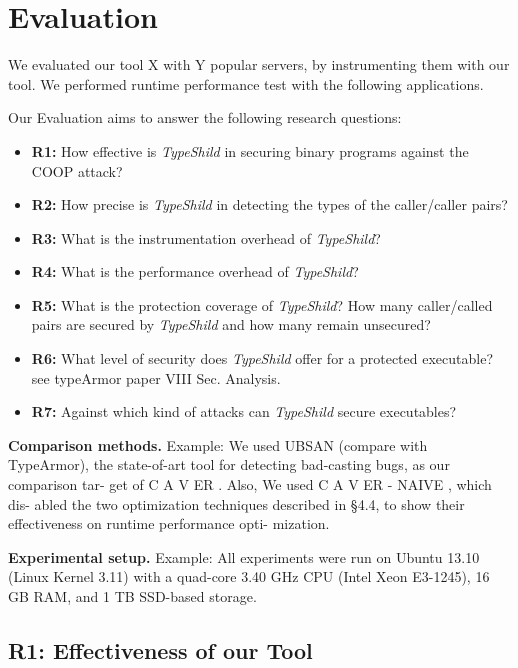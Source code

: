 \chapter{Evaluation}
\label{chapter:Evaluation}
We evaluated our tool X with Y popular servers, by instrumenting them with our tool.
We performed runtime performance test with the following applications.

Our Evaluation aims to answer the following research questions:
\begin{itemize}
 \item \textbf{R1:} How effective is \textit{TypeShild} in securing binary programs against the COOP attack?
 
 \item \textbf{R2:} How precise is  \textit{TypeShild} in detecting the types of the caller/caller pairs?
 
 \item \textbf{R3:} What is the instrumentation overhead of \textit{TypeShild}?
  
 \item \textbf{R4:} What is the performance overhead of \textit{TypeShild}?
 
 \item \textbf{R5:} What is the protection coverage of \textit{TypeShild}?
 How many caller/called pairs are secured by \textit{TypeShild} and how many remain unsecured?
 
 \item \textbf{R6:} What level of security does \textit{TypeShild} offer for a protected executable? 
 see typeArmor paper VIII Sec. Analysis.
  
 \item \textbf{R7:} Against which kind of attacks can \textit{TypeShild} secure executables?
 
\end{itemize}

\textbf{Comparison methods.} Example: We used UBSAN (compare with TypeArmor), the state-of-art
tool for detecting bad-casting bugs, as our comparison tar-
get of C A V ER . Also, We used C A V ER - NAIVE , which dis-
abled the two optimization techniques described in §4.4,
to show their effectiveness on runtime performance opti-
mization.

\textbf{Experimental setup.} Example: All experiments were run on
Ubuntu 13.10 (Linux Kernel 3.11) with a quad-core 3.40
GHz CPU (Intel Xeon E3-1245), 16 GB RAM, and 1 TB
SSD-based storage.


\section{R1: Effectiveness of our Tool}
\label{R1: Effectiveness of our Tool}

